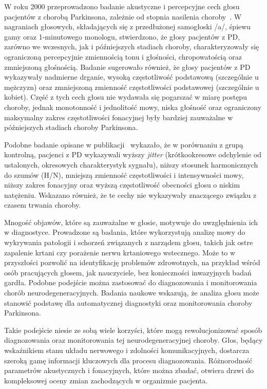 W roku 2000 przeprowadzono badanie akustyczne i percepcyjne cech głosu pacjentów z chorobą Parkinsona, zależnie od stopnia nasilenia choroby~\cite{holmes}.
W nagraniach głosowych, składających się z przedłużonej samogłoski /a/, śpiewu gamy oraz 1-minutowego monologu, stwierdzono, że głosy pacjentów z PD,
zarówno we wczesnych, jak i późniejszych stadiach choroby, charakteryzowały się ograniczoną percepcyjnie zmiennością tonu i głośności, chropowatością
oraz zmniejszoną głośnością.
Badanie sugerowało również, że głosy pacjentów z PD wykazywały nadmierne drganie, wysoką częstotliwość podstawową (szczególnie u mężczyzn) oraz zmniejszoną zmienność częstotliwości podstawowej (szczególnie u kobiet).
Część z tych cech głosu nie wydawała się pogarszać w miarę postępu choroby, jednak monotonność i jednolitość mowy, niska głośność oraz ograniczony maksymalny zakres częstotliwości fonacyjnej były bardziej zauważalne w późniejszych stadiach choroby Parkinsona.

Podobne badanie opisane w publikacji~\cite{GAMBOA1997314} wykazało, że w porównaniu z grupą kontrolną, pacjenci z PD wykazywali wyższy \emph{jitter} (krótkookresowe odchylenie od ustalonych, okresowych charakterystyk sygnału), niższy
stosunek harmonicznych do szumów (H/N), mniejszą zmienność częstotliwości i intensywności mowy, niższy zakres fonacyjny oraz wyższą częstotliwość
obecności głosu o niskim natężeniu.
Wskazano również, że te cechy nie wykazywały znaczącego związku z czasem trwania choroby.

Mnogość objawów, które są zauważalne w głosie, motywuje do uwzględnienia ich w diagnostyce.
Prowadzone są badania, które wykorzystują analizę mowy do wykrywania patologii i schorzeń związanych z narządem głosu, takich jak ostre zapalenie krtani czy porażenie nerwu krtaniowego wstecznego.
Może to w przyszłości pozwolić na identyfikację problemów zdrowotnych, na przykład wśród osób pracujących głosem, jak nauczyciele, bez konieczności inwazyjnych badań gardła.
Podobne podejście można zastosować do diagnozowania i monitorowania chorób neurodegeneracyjnych.
Badania naukowe wskazują, że analiza głosu może stanowić podstawę dla automatycznej diagnostyki oraz monitorowania choroby Parkinsona.

Takie podejście niesie ze sobą wiele korzyści, które mogą rewolucjonizować sposób diagnozowania oraz monitorowania tej neurodegeneracyjnej choroby.
Głos, będący wskaźnikiem stanu układu nerwowego i zdolności komunikacyjnych, dostarcza szeroką gamę informacji kluczowych dla procesu diagnozowania.
Różnorodność parametrów akustycznych i fonacyjnych, które można zbadać, otwiera drzwi do kompleksowej oceny zmian zachodzących w organizmie pacjenta.

